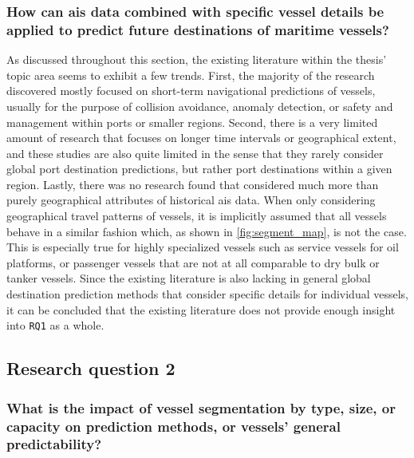 \subsubsection{How can \acrshort{ais} data combined with specific vessel details be applied to predict future destinations of maritime vessels?}

As discussed throughout this section, the existing literature within the thesis' topic area seems to exhibit a few trends. First, the majority of the research discovered mostly focused on short-term navigational predictions of vessels, usually for the purpose of collision avoidance, anomaly detection, or safety and management within ports or smaller regions. Second, there is a very limited amount of research that focuses on longer time intervals or geographical extent, and these studies are also quite limited in the sense that they rarely consider global port destination predictions, but rather port destinations within a given region. Lastly, there was no research found that considered much more than purely geographical attributes of historical \acrshort{ais} data. When only considering geographical travel patterns of vessels, it is implicitly assumed that all vessels behave in a similar fashion which, as shown in \cref{fig:segment_map}, is not the case. This is especially true for highly specialized vessels such as service vessels for oil platforms, or passenger vessels that are not at all comparable to dry bulk or tanker vessels. Since the existing literature is also lacking in general global destination prediction methods that consider specific details for individual vessels, it can be concluded that the existing literature does not provide enough insight into \texttt{RQ1} as a whole.

\subsection{Research question 2}
\subsubsection{What is the impact of vessel segmentation by type, size, or capacity on prediction methods, or vessels' general predictability?}

